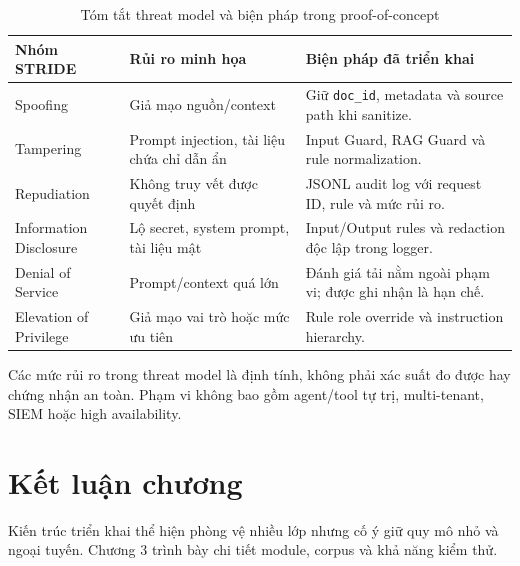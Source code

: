 \begin{table}[H]
\centering
\caption{Tóm tắt threat model và biện pháp trong proof-of-concept}
\label{tab:stride-final}
\begin{tabularx}{\textwidth}{p{2.8cm}p{3.5cm}X}
\toprule
Nhóm STRIDE & Rủi ro minh họa & Biện pháp đã triển khai \\
\midrule
Spoofing & Giả mạo nguồn/context & Giữ \texttt{doc\_id}, metadata và source path khi sanitize. \\
Tampering & Prompt injection, tài liệu chứa chỉ dẫn ẩn & Input Guard, RAG Guard và rule normalization. \\
Repudiation & Không truy vết được quyết định & JSONL audit log với request ID, rule và mức rủi ro. \\
Information Disclosure & Lộ secret, system prompt, tài liệu mật & Input/Output rules và redaction độc lập trong logger. \\
Denial of Service & Prompt/context quá lớn & Đánh giá tải nằm ngoài phạm vi; được ghi nhận là hạn chế. \\
Elevation of Privilege & Giả mạo vai trò hoặc mức ưu tiên & Rule role override và instruction hierarchy. \\
\bottomrule
\end{tabularx}
\end{table}

Các mức rủi ro trong threat model là định tính, không phải xác suất đo được hay
chứng nhận an toàn. Phạm vi không bao gồm agent/tool tự trị, multi-tenant, SIEM
hoặc high availability.

\section{Kết luận chương}

Kiến trúc triển khai thể hiện phòng vệ nhiều lớp nhưng cố ý giữ quy mô nhỏ và
ngoại tuyến. Chương 3 trình bày chi tiết module, corpus và khả năng kiểm thử.
